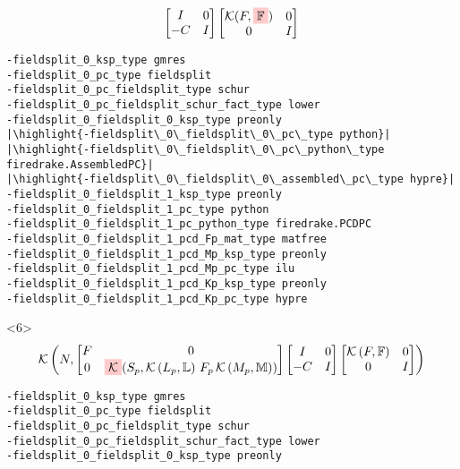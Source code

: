 \documentclass[presentation]{beamer}
\newcommand{\KSP}[2]{\ensuremath{\mathcal{K}\left(#1, \mathbb{#2}\right)}}
\newcommand{\ksp}[1]{\KSP{#1}{#1}}
\newcommand{\highlight}[1]{\colorbox{red!20}{\color{black} #1}}
\begin{document}
\begin{frame}[fragile]
\begin{onlyenv}
\begin{equation*}
{      \begin{bmatrix}
        I & 0\\
        -C & I
      \end{bmatrix}
      \begin{bmatrix}
        \mathcal{K}(F, \highlight{$\mathbb{F}$}) & 0 \\
        0 & I
      \end{bmatrix}}
    \end{equation*}
\begin{verbatim}
-fieldsplit_0_ksp_type gmres
-fieldsplit_0_pc_type fieldsplit
-fieldsplit_0_pc_fieldsplit_type schur
-fieldsplit_0_pc_fieldsplit_schur_fact_type lower
-fieldsplit_0_fieldsplit_0_ksp_type preonly
|\highlight{-fieldsplit\_0\_fieldsplit\_0\_pc\_type python}|
|\highlight{-fieldsplit\_0\_fieldsplit\_0\_pc\_python\_type firedrake.AssembledPC}|
|\highlight{-fieldsplit\_0\_fieldsplit\_0\_assembled\_pc\_type hypre}|
-fieldsplit_0_fieldsplit_1_ksp_type preonly
-fieldsplit_0_fieldsplit_1_pc_type python
-fieldsplit_0_fieldsplit_1_pc_python_type firedrake.PCDPC
-fieldsplit_0_fieldsplit_1_pcd_Fp_mat_type matfree
-fieldsplit_0_fieldsplit_1_pcd_Mp_ksp_type preonly
-fieldsplit_0_fieldsplit_1_pcd_Mp_pc_type ilu
-fieldsplit_0_fieldsplit_1_pcd_Kp_ksp_type preonly
-fieldsplit_0_fieldsplit_1_pcd_Kp_pc_type hypre
\end{verbatim}
  \end{onlyenv}
  \begin{onlyenv}<6>
    \color{gray}
    \begin{equation*}
      \KSP{N}{%
        \begin{bmatrix}
        F & 0 \\
        0 & \highlight{$\mathcal{K}$}(S_p, \KSP{L_p}{L}\,F_p \, \KSP{M_p}{M})
      \end{bmatrix}
      \begin{bmatrix}
        I & 0\\
        -C & I
      \end{bmatrix}
      \begin{bmatrix}
        \ksp{F} & 0 \\
        0 & I
      \end{bmatrix}}
    \end{equation*}
\begin{verbatim}
-fieldsplit_0_ksp_type gmres
-fieldsplit_0_pc_type fieldsplit
-fieldsplit_0_pc_fieldsplit_type schur
-fieldsplit_0_pc_fieldsplit_schur_fact_type lower
-fieldsplit_0_fieldsplit_0_ksp_type preonly

\end{verbatim}
\end{onlyenv}
\end{frame}
\end{document}
